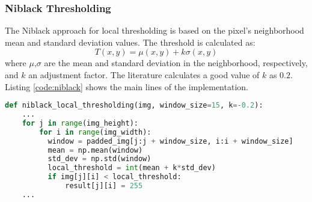 \documentclass[]{IEEEtran}
\begin{document}
\subsubsection{Niblack Thresholding}
The Niblack approach for local thresholding is based on the pixel's neighborhood mean and standard deviation values. The threshold is calculated as:
\begin{equation}
  T(x, y) = \mu(x, y) + k\sigma(x,y) 
\end{equation}
where $\mu$,$\sigma$ are the mean and standard deviation in the neighborhood, respectively, and $k$ an adjustment factor. The literature calculates a good value of $k$ as $0.2$. Listing \ref{code:niblack} shows the main lines of the implementation.

\begin{lstlisting}[language=Python, caption={Niblack Local Thresholding Implementation}, label={code:niblack}]
  def niblack_local_thresholding(img, window_size=15, k=-0.2):
    ...
    for j in range(img_height):
        for i in range(img_width):
          window = padded_img[j:j + window_size, i:i + window_size]
          mean = np.mean(window)
          std_dev = np.std(window)
          local_threshold = int(mean + k*std_dev)
          if img[j][i] < local_threshold:
              result[j][i] = 255
    ...
\end{lstlisting}


\end{document}
